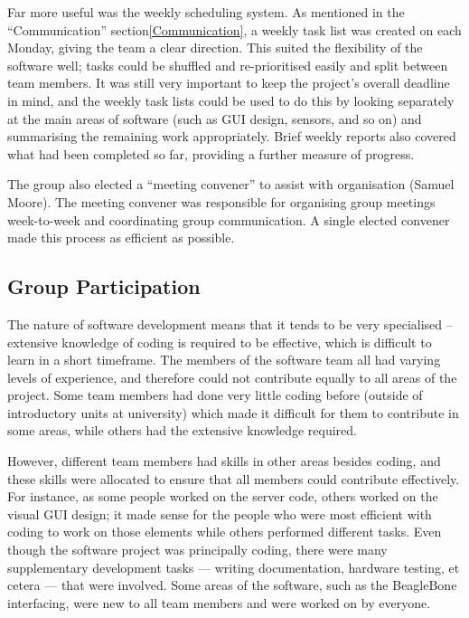 Far more useful was the weekly scheduling system. As mentioned in the ``Communication'' section\ref{Communication}, a weekly task list was created on each Monday, giving the team a clear direction. This suited the flexibility of the software well; tasks could be shuffled and re-prioritised easily and split between team members. It was still very important to keep the project’s overall deadline in mind, and the weekly task lists could be used to do this by looking separately at the main areas of software (such as GUI design, sensors, and so on) and summarising the remaining work appropriately. Brief weekly reports also covered what had been completed so far, providing a further measure of progress.


The group also elected a ``meeting convener'' to assist with organisation (Samuel Moore). The meeting convener was responsible for organising group meetings week-to-week and coordinating group communication. A single elected convener made this process as efficient as possible.

\subsection{Group Participation}

The nature of software development means that it tends to be very specialised – extensive knowledge of coding is required to be effective, which is difficult to learn in a short timeframe. The members of the software team all had varying levels of experience, and therefore could not contribute equally to all areas of the project. Some team members had done very little coding before (outside of introductory units at university) which made it difficult for them to contribute in some areas, while others had the extensive knowledge required.


However, different team members had skills in other areas besides coding, and these skills were allocated to ensure that all members could contribute effectively. For instance, as some people worked on the server code, others worked on the visual GUI design; it made sense for the people who were most efficient with coding to work on those elements while others performed different tasks. Even though the software project was principally coding, there were many supplementary development tasks --- writing documentation, hardware testing, et cetera --- that were involved. Some areas of the software, such as the BeagleBone interfacing, were new to all team members and were worked on by everyone.


